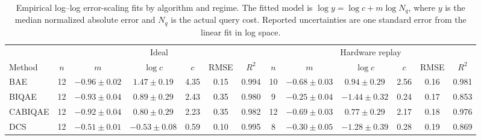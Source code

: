 \begin{table}[H]
\centering
\scriptsize
\setlength{\tabcolsep}{2.6pt}
\renewcommand{\arraystretch}{1.12}
\caption{
Empirical log--log error-scaling fits by algorithm and regime.
The fitted model is \(\log y=\log c+m\log N_q\), where \(y\) is the median
normalized absolute error and \(N_q\) is the actual query cost. Reported
uncertainties are one standard error from the linear fit in log space.
}
\label{tab:empirical_error_scaling_fit_metrics}
\begin{tabular}{lcccccc|cccccc}
\toprule
&
\multicolumn{6}{c|}{Ideal}
&
\multicolumn{6}{c}{Hardware replay}
\\
\cmidrule(lr){2-7}
\cmidrule(lr){8-13}
Method
& \(n\)
& \(m\)
& \(\log c\)
& \(c\)
& RMSE
& \(R^2\)
& \(n\)
& \(m\)
& \(\log c\)
& \(c\)
& RMSE
& \(R^2\)
\\
\midrule
BAE
& 12 & \(-0.96\pm 0.02\) & \(1.47\pm 0.19\) & 4.35 & 0.15 & 0.994
& 10 & \(-0.68\pm 0.03\) & \(0.94\pm 0.29\) & 2.56 & 0.16 & 0.981
\\
BIQAE
& 12 & \(-0.93\pm 0.04\) & \(0.89\pm 0.29\) & 2.43 & 0.35 & 0.980
& 9 & \(-0.25\pm 0.04\) & \(-1.44\pm 0.32\) & 0.24 & 0.17 & 0.853
\\
CABIQAE
& 12 & \(-0.92\pm 0.04\) & \(0.80\pm 0.29\) & 2.23 & 0.35 & 0.982
& 12 & \(-0.69\pm 0.03\) & \(0.77\pm 0.29\) & 2.17 & 0.18 & 0.976
\\
DCS
& 12 & \(-0.51\pm 0.01\) & \(-0.53\pm 0.08\) & 0.59 & 0.10 & 0.995
& 8 & \(-0.30\pm 0.05\) & \(-1.28\pm 0.39\) & 0.28 & 0.19 & 0.869
\\
\bottomrule
\end{tabular}
\end{table}
